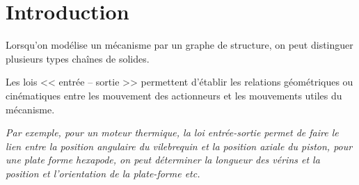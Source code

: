 \def\xxactivite{Cours}
\def\xxauteur{\textsl{Xavier Pessoles}}

\fichetrue
\proftrue
\tdfalse
\coursfalse


\def\xxnumchapitre{Révisions 6 \vspace{.2cm}}
\def\xxchapitre{\hspace{.12cm} Lois Entrée -- Sortie}


\def\xxcompetences{%
\textsl{%
\textbf{Savoirs et compétences :}\\
\begin{itemize}[label=\ding{112},font=\color{ocre}] 
\item **\textit{Mod2.C1 : }Chaîne d’énergie et d'information
\end{itemize}
}}

\def\xxfigures{
\\
}%


\iflivret

\else

\fi
\setlength{\columnseprule}{.1pt}

\vspace{1.2cm}
\pagestyle{fancy}
\thispagestyle{plain}



\setcounter{section}{0}
\section{Introduction}
\begin{defi}
Lorsqu'on modélise un mécanisme par un graphe de structure, on peut distinguer plusieurs types chaînes de solides.


Les lois << entrée -- sortie >> permettent d'établir les relations géométriques ou cinématiques entre les mouvement des actionneurs et les mouvements utiles du mécanisme. 

\textit{Par exemple, pour un moteur thermique, la loi entrée-sortie permet de faire le lien entre la position angulaire du vilebrequin et la position axiale du piston, pour une plate forme hexapode, on peut déterminer la longueur des vérins et la position et l'orientation de la plate-forme \textit{etc.}}
\end{defi}



